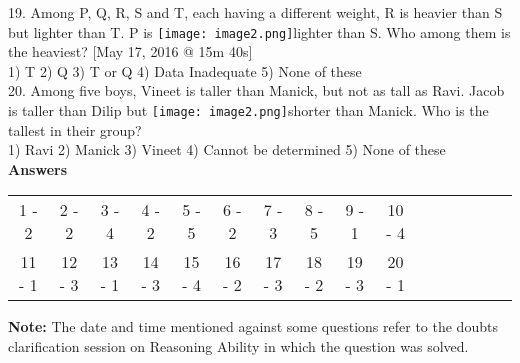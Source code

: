 \documentclass[
]{article}
\begin{document}
19. Among P, Q, R, S and T, each having a different weight, R is heavier than S but lighter than T. P is \texttt{[image: image2.png]}lighter than S. Who among them is the heaviest? [May 17, 2016 @ 15m 40s]\\
1) T \hspace{2mm}2) Q \hspace{2mm}3) T or Q \hspace{2mm}4) Data Inadequate \hspace{2mm}5) None of these\\

20. Among five boys, Vineet is taller than Manick, but not as tall as Ravi. Jacob is taller than Dilip but \texttt{[image: image2.png]}shorter than Manick. Who is the tallest in their group?\\
1) Ravi \hspace{2mm}2) Manick \hspace{2mm}3) Vineet
\hspace{2mm}4) Cannot be determined \hspace{2mm}5) None of these\\

\textbf{Answers}\\
\begin{tabular}{ c c c c c c c c c c c c c c c c}
1 - 2 &2 - 2 &3 - 4 &4 - 2 &5 - 5 &6 - 2 &7 - 3 &8 - 5 &9 - 1 &10 - 4\\
11 - 1 &12 - 3 &13 - 1 &14 - 3 &15 - 4 &16 - 2 &17 - 3 &18 - 2 &19 - 3 &20 - 1\\
\end{tabular}

\textbf{Note:} The date and time mentioned against some questions refer to the doubts clarification
session on Reasoning Ability in which the question was solved.
\end{document}
